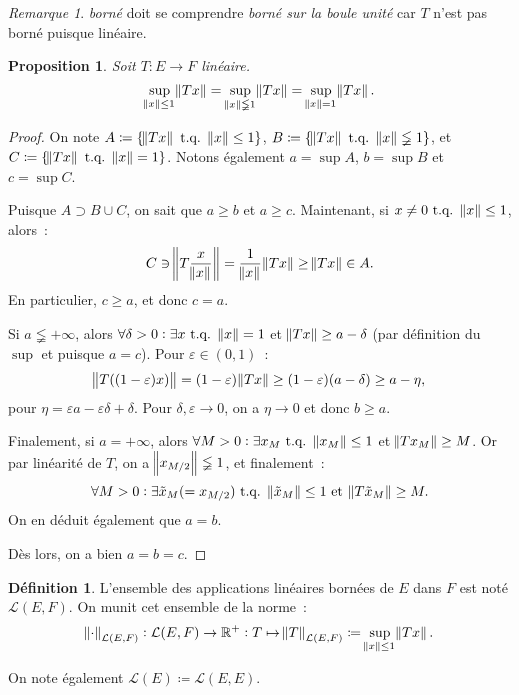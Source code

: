 \documentclass{report}
\newcommand{\tq}{\text{ t.q. }}
\newcommand{\st}{\tq}
\newcommand{\pinfty}{{+\infty}}
\newtheorem{prp}[thm]{Proposition}
\theoremstyle{definition}
\newtheorem{déf}[thm]{Définition}
\theoremstyle{remark}
\newtheorem*{rmq}{Remarque}
\begin{document}
\begin{rmq} \textit{borné} doit se comprendre \textit{borné sur la boule unité} car $T$ n'est pas borné puisque linéaire.
\end{rmq}

\begin{prp} Soit $T : E \to F$ linéaire.
\[\sup_{\norm x \leq 1}\norm {Tx} = \sup_{\norm x \lneqq 1}\norm {Tx} = \sup_{\norm x = 1}\norm {Tx}.\]
\end{prp}

\begin{proof} On note $A \coloneqq \{\norm {Tx} \st \norm x \leq 1\}$, $B \coloneqq \{\norm {Tx} \st \norm x \lneqq 1\}$, et $C \coloneqq \{\norm {Tx} \st \norm x = 1\}$.
Notons également $a = \sup A$, $b = \sup B$ et $c = \sup C$.

Puisque $A \supset B \cup C$, on sait que $a \geq b$ et $a \geq c$. Maintenant, si $x \neq 0 \st \norm x \leq 1$, alors~:
\[C \ni \norm {T\frac x{\norm x}} = \frac 1{\norm x}\norm {Tx} \geq \norm {Tx} \in A.\]
En particulier, $c \geq a$, et donc $c=a$.

Si $a \lneqq \pinfty$, alors $\forall \delta > 0 : \exists x \st \norm x = 1$ et $\norm {Tx} \geq a-\delta$ (par définition du $\sup$ et puisque $a=c$). Pour $\varepsilon \in (0, 1)$~:
\[\norm {T((1-\varepsilon)x)} = (1-\varepsilon)\norm {Tx} \geq (1-\varepsilon)(a-\delta) \geq a-\eta,\]
pour $\eta = \varepsilon a - \varepsilon \delta + \delta$. Pour $\delta, \varepsilon \to 0$, on a $\eta \to 0$ et donc $b \geq a$.

Finalement, si $a = \pinfty$, alors $\forall M > 0 : \exists x_M \st \norm {x_M} \leq 1$ et $\norm {Tx_M} \geq M$. Or par linéarité de $T$, on a $\norm {x_{M/2}} \lneqq 1$,
et finalement~:
\[\forall M > 0 : \exists \tilde x_M (= x_{M/2}) \st \norm {\tilde x_M} \leq 1 \text{ et } \norm {T\tilde x_M} \geq M.\]
On en déduit également que $a=b$.

Dès lors, on a bien $a = b = c$.
\end{proof}

\begin{déf} L'ensemble des applications linéaires bornées de $E$ dans $F$ est noté $\mathcal L(E, F)$. On munit cet ensemble de la norme~:
\[\norm \cdot_{\mathcal L(E, F)} : \mathcal L(E, F) \to \mathbb R^+ : T \mapsto \norm T_{\mathcal L(E, F)} \coloneqq \sup_{\norm x \leq 1}\norm {Tx}.\]

On note également $\mathcal L(E) \coloneqq \mathcal L(E, E)$.
\end{déf}
\end{document}
